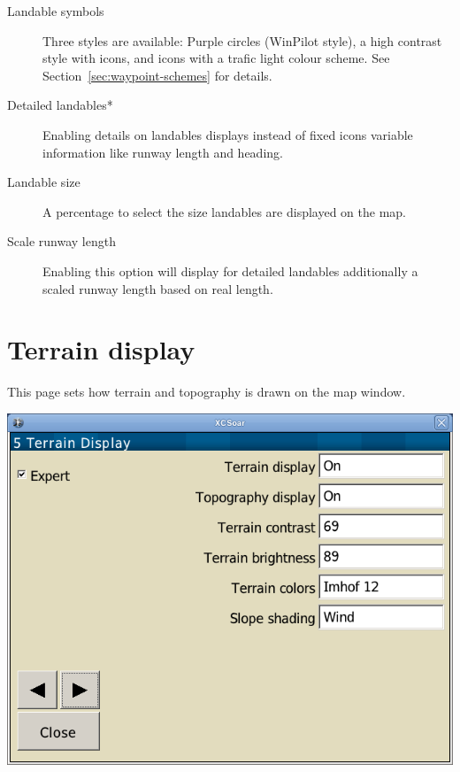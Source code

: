 \begin{description}
\item[Landable symbols]  \label{conf:waypointicons} Three styles are available:
 Purple circles (WinPilot style), a high contrast style with icons,
 and icons with a trafic light colour scheme. See Section~\ref{sec:waypoint-schemes} for details.
\item[Detailed landables*]  Enabling details on landables displays instead of fixed icons 
 variable information like runway length and heading.
\item[Landable size]  A percentage to select the size landables are displayed on the map.
\item[Scale runway length]  Enabling this option will display for detailed landables 
 additionally a scaled runway length based on real length.
\end{description}


\clearpage
\section{Terrain display}\label{sec:terrain-display}

This page sets how terrain and topography is drawn on the map window.

\begin{center}
\includegraphics[angle=0,width=0.8\linewidth,keepaspectratio='true']{figures/config-terrain.png}
\end{center}

